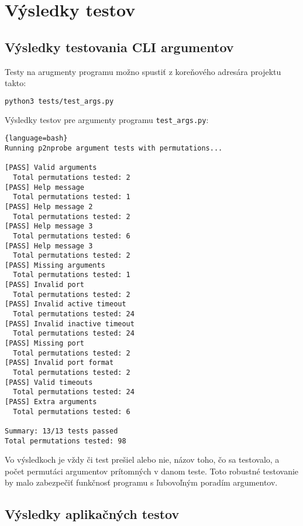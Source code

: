 \documentclass[a4paper, 12pt]{article}
\begin{document}
\newpage

\section{Výsledky testov}

\subsection{Výsledky testovania CLI argumentov}

Testy na arugmenty programu možno spustiť z koreňového adresára projektu takto:
\begin{lstlisting}[language=bash]
    python3 tests/test_args.py
\end{lstlisting}


Výsledky testov pre argumenty programu \texttt{test\_args.py}:

\begin{lstlisting}{language=bash}
Running p2nprobe argument tests with permutations...

[PASS] Valid arguments
  Total permutations tested: 2
[PASS] Help message
  Total permutations tested: 1
[PASS] Help message 2
  Total permutations tested: 2
[PASS] Help message 3
  Total permutations tested: 6
[PASS] Help message 3
  Total permutations tested: 2
[PASS] Missing arguments
  Total permutations tested: 1
[PASS] Invalid port
  Total permutations tested: 2
[PASS] Invalid active timeout
  Total permutations tested: 24
[PASS] Invalid inactive timeout
  Total permutations tested: 24
[PASS] Missing port
  Total permutations tested: 2
[PASS] Invalid port format
  Total permutations tested: 2
[PASS] Valid timeouts
  Total permutations tested: 24
[PASS] Extra arguments
  Total permutations tested: 6

Summary: 13/13 tests passed
Total permutations tested: 98
\end{lstlisting}
Vo výsledkoch je vždy či test prešiel alebo nie, názov toho, čo sa testovalo, a počet permutáci argumentov prítomných v danom teste.
Toto robustné testovanie by malo zabezpečiť funkčnosť programu s ľubovoľným poradím argumentov.

\newpage

\subsection{Výsledky aplikačných testov}



\newpage
\end{document}

